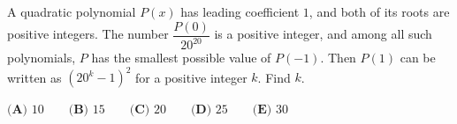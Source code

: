 A quadratic polynomial $P(x)$ has leading coefficient $1$, and both of its roots are positive integers. The number $\dfrac{P(0)}{20^{20}}$ is a positive integer, and among all such polynomials, $P$ has the smallest possible value of $P(-1)$. Then $P(1)$ can be written as $\left(20^k-1\right)^2$ for a positive integer $k$. Find $k$.

$\textbf{(A) }10\qquad\textbf{(B) }15\qquad\textbf{(C) }20\qquad\textbf{(D) }25\qquad\textbf{(E) }30$
